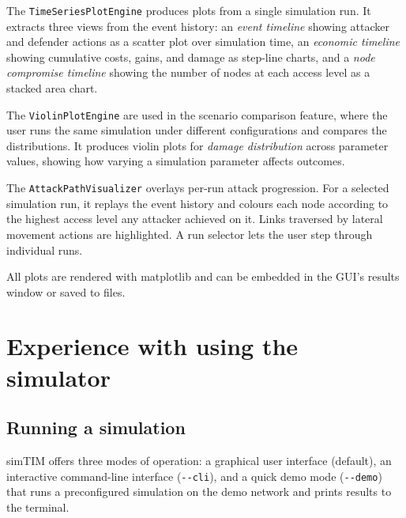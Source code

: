 \documentclass{llncs}
\begin{document}
The \texttt{TimeSeriesPlotEngine} produces plots from a single simulation run. It extracts three views from the event history: an \emph{event timeline} showing attacker and defender actions as a scatter plot over simulation time, an \emph{economic timeline} showing cumulative costs, gains, and damage as step-line charts, and a \emph{node compromise timeline} showing the number of nodes at each access level as a stacked area chart.

The \texttt{ViolinPlotEngine} are used in the scenario comparison feature, where the user runs the same simulation under different configurations and compares the distributions. It produces violin plots for \emph{damage distribution} across parameter values, showing how varying a simulation parameter affects outcomes.

The \texttt{AttackPathVisualizer} overlays per-run attack progression. For a selected simulation run, it replays the event history and colours each node according to the highest access level any attacker achieved on it. Links traversed by lateral movement actions are highlighted. A run selector lets the user step through individual runs.

All plots are rendered with matplotlib and can be embedded in the GUI's results window or saved to files.




\section{Experience with using the simulator}

\subsection{Running a simulation}
simTIM offers three modes of operation: a graphical user interface (default), an interactive command-line interface (\texttt{-{}-cli}), and a quick demo mode (\texttt{-{}-demo}) that runs a preconfigured simulation on the demo network and prints results to the terminal.
\end{document}
